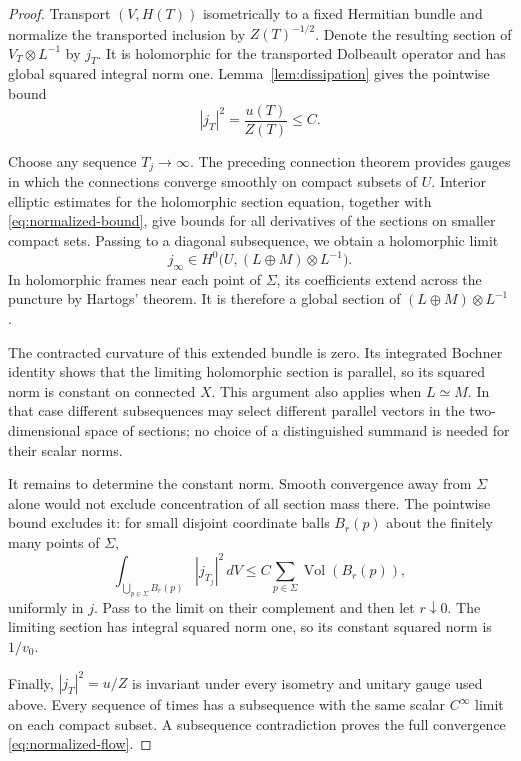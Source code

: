 \documentclass[11pt]{amsart}
\theoremstyle{definition}
\theoremstyle{remark}
\newcommand{\Vol}{\operatorname{Vol}}
\begin{document}
\begin{proof}
Transport $(V,H(T))$ isometrically to a fixed Hermitian bundle and
normalize the transported inclusion by $Z(T)^{-1/2}$. Denote the
resulting section of $V_T\otimes L^{-1}$ by $j_T$. It is holomorphic
for the transported Dolbeault operator and has global squared integral
norm one. Lemma~\ref{lem:dissipation} gives the pointwise bound
\begin{equation}\label{eq:normalized-bound}
 |j_T|^2=\frac{u(T)}{Z(T)}\le C.
\end{equation}

Choose any sequence $T_j\to\infty$. The preceding connection theorem
provides gauges in which the connections converge smoothly on compact
subsets of $U$. Interior elliptic estimates for the holomorphic section
equation, together with \eqref{eq:normalized-bound}, give bounds for all
derivatives of the sections on smaller compact sets. Passing to a diagonal
subsequence, we obtain a holomorphic limit
\[
 j_\infty\in H^0\bigl(U,(L\oplus M)\otimes L^{-1}\bigr).
\]
In holomorphic frames near each point of $\Sigma$, its coefficients
extend across the puncture by Hartogs' theorem. It is therefore a global
section of $(L\oplus M)\otimes L^{-1}$.

The contracted curvature of this extended bundle is zero. Its integrated
Bochner identity shows that the limiting holomorphic section is parallel,
so its squared norm is constant on connected $X$. This argument also
applies when $L\simeq M$. In that case different subsequences may select
different parallel vectors in the two-dimensional space of sections;
no choice of a distinguished summand is needed for their scalar norms.

It remains to determine the constant norm. Smooth convergence away from
$\Sigma$ alone would not exclude concentration of all section mass there.
The pointwise bound excludes it: for small disjoint coordinate balls
$B_r(p)$ about the finitely many points of $\Sigma$,
\[
 \int_{\bigcup_{p\in\Sigma} B_r(p)}|j_{T_j}|^2\,dV
 \le C\sum_{p\in\Sigma}\Vol(B_r(p)),
\]
uniformly in $j$. Pass to the limit on their complement and then let
$r\downarrow0$. The limiting section has integral squared norm one,
so its constant squared norm is $1/v_0$.

Finally, $|j_T|^2=u/Z$ is invariant under every isometry and unitary
gauge used above. Every sequence of times has a subsequence with the
same scalar $C^\infty$ limit on each compact subset. A subsequence
contradiction proves the full convergence \eqref{eq:normalized-flow}.
\end{proof}
\end{document}
